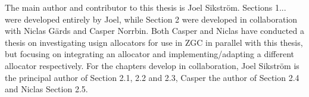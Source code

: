 
The main author and contributor to this thesis is Joel Sikström. Sections 1... were developed entirely by Joel, while Section 2 were developed in collaboration with Niclas Gärds and Casper Norrbin. Both Casper and Niclas have conducted a thesis on investigating usign allocators for use in ZGC in parallel with this thesis, but focusing on integrating an allocator and implementing/adapting a different allocator respectively. For the chapters develop in collaboration, Joel Sikström is the principal author of Section 2.1, 2.2 and 2.3, Casper the author of Section 2.4 and Niclas Section 2.5.

